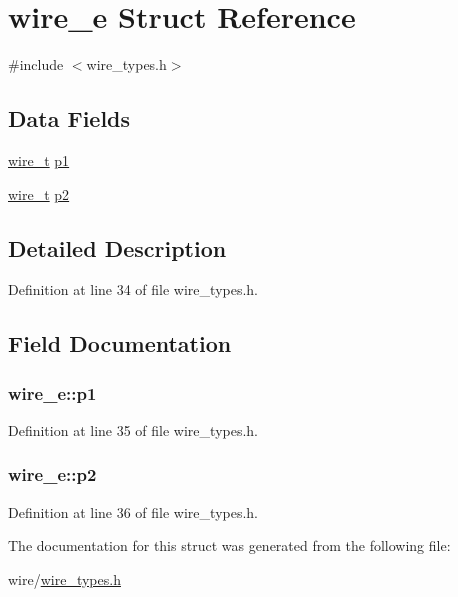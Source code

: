 \hypertarget{structwire__e}{\section{wire\-\_\-e Struct Reference}
\label{structwire__e}
}


{\ttfamily \#include $<$wire\-\_\-types.\-h$>$}

\subsection*{Data Fields}
\begin{DoxyCompactItemize}
\item 
\hyperlink{wire__types_8h_ace84d5e6e326f6a52d978bd9900baee6}{wire\-\_\-t} \hyperlink{structwire__e_a00cfec6074c9bfb7f674fed20174abad}{p1}
\item 
\hyperlink{wire__types_8h_ace84d5e6e326f6a52d978bd9900baee6}{wire\-\_\-t} \hyperlink{structwire__e_a2167b2f5bbd853ae35f7bb53a1a2685d}{p2}
\end{DoxyCompactItemize}


\subsection{Detailed Description}


Definition at line 34 of file wire\-\_\-types.\-h.



\subsection{Field Documentation}
\hypertarget{structwire__e_a00cfec6074c9bfb7f674fed20174abad}{
\subsubsection[{p1}]{ wire\-\_\-e\-::p1}}\label{structwire__e_a00cfec6074c9bfb7f674fed20174abad}


Definition at line 35 of file wire\-\_\-types.\-h.

\hypertarget{structwire__e_a2167b2f5bbd853ae35f7bb53a1a2685d}{
\subsubsection[{p2}]{ wire\-\_\-e\-::p2}}\label{structwire__e_a2167b2f5bbd853ae35f7bb53a1a2685d}


Definition at line 36 of file wire\-\_\-types.\-h.



The documentation for this struct was generated from the following file\-:\begin{DoxyCompactItemize}
\item 
wire/\hyperlink{wire__types_8h}{wire\-\_\-types.\-h}\end{DoxyCompactItemize}
